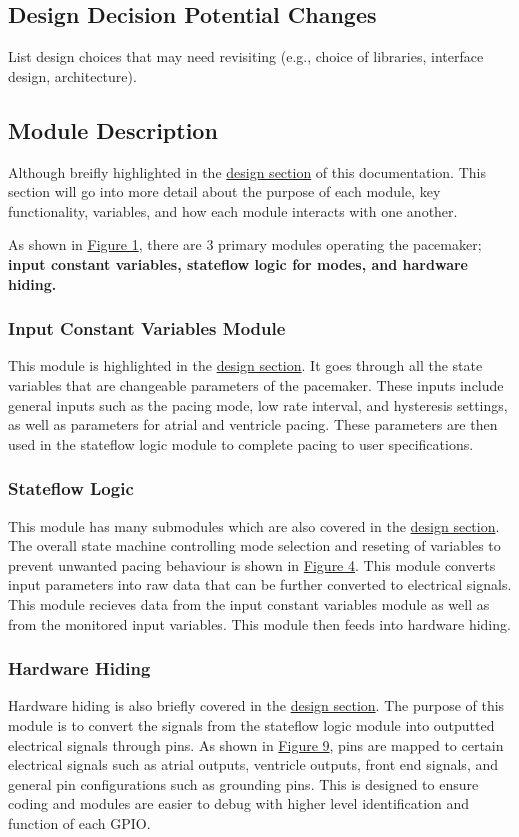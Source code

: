 \documentclass{article}
\begin{document}
\subsection{Design Decision Potential Changes}
List design choices that may need revisiting (e.g., choice of libraries, interface design, architecture).

\newpage
\subsection{Module Description}

Although breifly highlighted in the \hyperref[dessec]{design section} of this documentation. This section will go 
into more detail about the purpose of each module, key functionality, variables, and how each module interacts with 
one another. 

As shown in \hyperref[SimWholeView]{Figure 1}, there are 3 primary modules operating the pacemaker; \textbf{input constant variables, 
stateflow logic for modes, and hardware hiding.}

\subsubsection{Input Constant Variables Module}
This module is highlighted in the \hyperref[dessec]{design section}. It goes through all the state variables that 
are changeable parameters of the pacemaker. These inputs include general inputs such as the pacing mode, low rate interval, and hysteresis settings, as well 
as parameters for atrial and ventricle pacing. These parameters are then used in the stateflow logic module to 
complete pacing to user specifications.

\subsubsection{Stateflow Logic}
This module has many submodules which are also covered in the \hyperref[dessec]{design section}. The overall state machine controlling 
mode selection and reseting of variables to prevent unwanted pacing behaviour is shown in \hyperref[StateMod]{Figure 4}. This module 
converts input parameters into raw data that can be further converted to electrical signals. This module recieves data 
from the input constant variables module as well as from the monitored input variables. This module then feeds into 
hardware hiding. 

\subsubsection{Hardware Hiding}
Hardware hiding is also briefly covered in the \hyperref[dessec]{design section}. The purpose of this module is 
to convert the signals from the stateflow logic module into outputted electrical signals through pins. As shown in 
\hyperref[HardHide]{Figure 9}, pins are mapped to certain electrical signals such as atrial outputs, ventricle outputs, 
front end signals, and general pin configurations such as grounding pins. This is designed to ensure coding and modules 
are easier to debug with higher level identification and function of each GPIO. 
\end{document}
